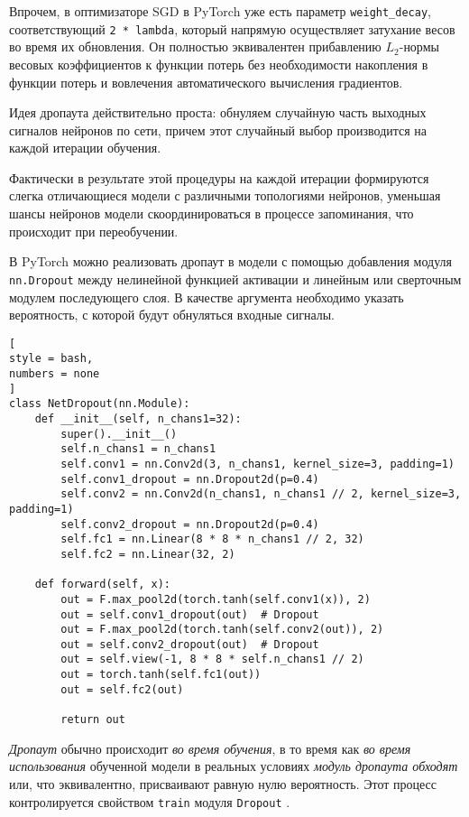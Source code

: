 \documentclass[%
	11pt,
	a4paper,
	utf8,
		]{article}
\begin{document}
Впрочем, в оптимизаторе SGD в PyTorch уже есть параметр \verb|weight_decay|, соответствующий \verb|2 * lambda|, который напрямую осуществляет затухание весов во время их обновления. Он полностью эквивалентен прибавлению $L_2$-нормы весовых коэффициентов к функции потерь без необходимости накопления в функции потерь и вовлечения автоматического вычисления градиентов.

Идея дропаута действительно проста: обнуляем случайную часть выходных сигналов нейронов по сети, причем этот случайный выбор производится на каждой итерации обучения. 

Фактически в результате этой процедуры на каждой итерации формируются слегка отличающиеся модели с различными топологиями нейронов, уменьшая шансы нейронов модели скоординироваться в процессе запоминания, что происходит при переобучении.

В PyTorch можно реализовать дропаут в модели с помощью добавления модуля \verb|nn.Dropout| между нелинейной функцией активации и линейным или сверточным модулем последующего слоя. В качестве аргумента необходимо указать вероятность, с которой будут обнуляться входные сигналы.
\begin{lstlisting}[
style = bash,
numbers = none
]
class NetDropout(nn.Module):
    def __init__(self, n_chans1=32):
        super().__init__()
        self.n_chans1 = n_chans1
        self.conv1 = nn.Conv2d(3, n_chans1, kernel_size=3, padding=1)
        self.conv1_dropout = nn.Dropout2d(p=0.4)
        self.conv2 = nn.Conv2d(n_chans1, n_chans1 // 2, kernel_size=3, padding=1)
        self.conv2_dropout = nn.Dropout2d(p=0.4)
        self.fc1 = nn.Linear(8 * 8 * n_chans1 // 2, 32)
        self.fc2 = nn.Linear(32, 2)
        
    def forward(self, x):
        out = F.max_pool2d(torch.tanh(self.conv1(x)), 2)
        out = self.conv1_dropout(out)  # Dropout
        out = F.max_pool2d(torch.tanh(self.conv2(out)), 2)
        out = self.conv2_dropout(out)  # Dropout
        out = self.view(-1, 8 * 8 * self.n_chans1 // 2)
        out = torch.tanh(self.fc1(out))
        out = self.fc2(out)
        
        return out
\end{lstlisting}

\emph{Дропаут} обычно происходит \emph{во время обучения}, в то время как \emph{во время использования} обученной модели в реальных условиях \emph{модуль дропаута обходят} или, что эквивалентно, присваивают равную нулю вероятность. Этот процесс контролируется свойством \verb|train| модуля \verb|Dropout| \cite[]{pytorch-2022}.
\end{document}
